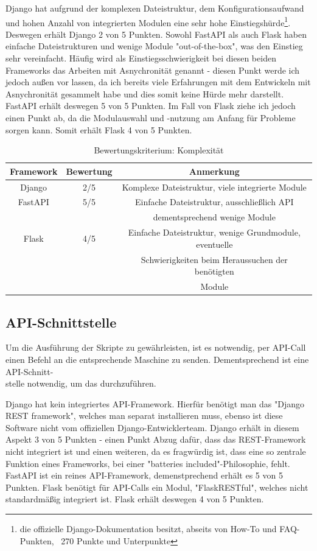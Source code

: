 \documentclass[letterpaper,11pt,leqno]{article}
\begin{document}
Django hat aufgrund der komplexen Dateistruktur, dem Konfigurationsaufwand und hohen Anzahl von
integrierten Modulen eine sehr hohe Einstiegshürde\footnote{die offizielle Django-Dokumentation
besitzt, abseits von How-To und FAQ-Punkten, ~270 Punkte und Unterpunkte}. Deswegen erhält Django 2
von 5 Punkten. Sowohl FastAPI als auch Flask haben einfache Dateistrukturen und wenige Module
"out-of-the-box", was den Einstieg sehr vereinfacht. Häufig wird als Einstiegsschwierigkeit bei
diesen beiden Frameworks das Arbeiten mit Asnychronität genannt - diesen Punkt werde ich jedoch
außen vor lassen, da ich bereits viele Erfahrungen mit dem Entwickeln mit Asnychronität gesammelt
habe und dies somit keine Hürde mehr darstellt. FastAPI erhält deswegen 5 von 5 Punkten. Im Fall von
Flask ziehe ich jedoch einen Punkt ab, da die Modulauswahl und -nutzung am Anfang für Probleme
sorgen kann. Somit erhält Flask 4 von 5 Punkten.
\begin{table}[h!]
	\begin{center}
		\begin{tabular}{|c||c|c|}
			\hline
			Framework & Bewertung & Anmerkung\\
			\hline\hline
			Django & 2/5 & Komplexe Dateistruktur, viele integrierte Module\\
			FastAPI & 5/5 & Einfache Dateistruktur, ausschließlich API\\
			& & dementsprechend wenige Module\\
			Flask & 4/5 & Einfache Dateistruktur, wenige Grundmodule, eventuelle\\
			& & Schwierigkeiten beim Heraussuchen der benötigten\\
			& & Module\\
			\hline
		\end{tabular}
		\caption{Bewertungskriterium: Komplexität}
	\end{center}
	\label{table:4}
\end{table}

\subsection{API-Schnittstelle}
Um die Ausführung der Skripte zu gewährleisten, ist es notwendig, per API-Call einen Befehl an die
entsprechende Maschine zu senden. Dementsprechend ist eine API-Schnitt-\\stelle notwendig, um das
durchzuführen.

Django hat kein integriertes API-Framework. Hierfür benötigt man das "Django REST framework",
welches man separat installieren muss, ebenso ist diese Software nicht vom offiziellen
Django-Entwicklerteam. Django erhält in diesem Aspekt 3 von 5 Punkten - einen Punkt Abzug dafür,
dass das REST-Framework nicht integriert ist und einen weiteren, da es fragwürdig ist, dass eine so
zentrale Funktion eines Frameworks, bei einer "batteries included"-Philosophie, fehlt. FastAPI ist
ein reines API-Framework, demenstprechend erhält es 5 von 5 Punkten. Flask benötigt für API-Calls
ein Modul,  "FlaskRESTful", welches nicht standardmäßig integriert ist. Flask erhält deswegen 4 von
5 Punkten. 
\end{document}
